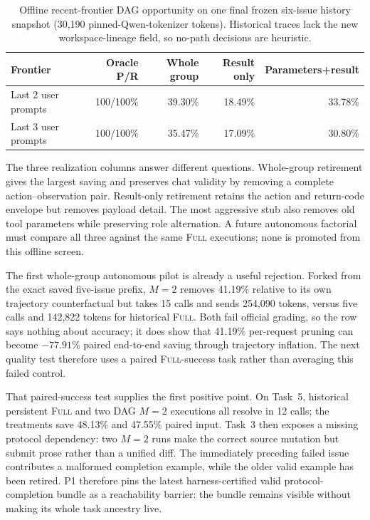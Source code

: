 \documentclass[11pt]{article}
\begin{document}
\begin{table}[H]
\centering
\footnotesize
\caption{Offline recent-frontier DAG opportunity on one final frozen six-issue
history snapshot (30,190 pinned-Qwen-tokenizer tokens).  Historical traces lack the new
workspace-lineage field, so no-path decisions are heuristic.}
\label{tab:frontier-dag-oracle}
\begin{tabular}{lrrrr}
\toprule
Frontier & Oracle P/R & Whole group & Result only & Parameters+result \\
\midrule
Last 2 user prompts & 100/100\% & 39.30\% & 18.49\% & 33.78\% \\
Last 3 user prompts & 100/100\% & 35.47\% & 17.09\% & 30.80\% \\
\bottomrule
\end{tabular}
\end{table}

The three realization columns answer different questions.  Whole-group
retirement gives the largest saving and preserves chat validity by removing a
complete action--observation pair.  Result-only retirement retains the action
and return-code envelope but removes payload detail.  The most aggressive
stub also removes old tool parameters while preserving role alternation.  A
future autonomous factorial must compare all three against the same
\textsc{Full} executions; none is promoted from this offline screen.

The first whole-group autonomous pilot is already a useful rejection.  Forked
from the exact saved five-issue prefix, $M=2$ removes 41.19\% relative to its
own trajectory counterfactual but takes 15 calls and sends 254,090 tokens,
versus five calls and 142,822 tokens for historical \textsc{Full}.  Both fail
official grading, so the row says nothing about accuracy; it does show that
41.19\% per-request pruning can become $-77.91$\% paired end-to-end saving
through trajectory inflation.  The next quality test therefore uses a paired
\textsc{Full}-success task rather than averaging this failed control.

That paired-success test supplies the first positive point.  On Task~5,
historical persistent \textsc{Full} and two DAG $M=2$ executions all resolve
in 12 calls; the treatments save 48.13\% and 47.55\% paired input.  Task~3
then exposes a missing protocol dependency: two $M=2$ runs make the correct
source mutation but submit prose rather than a unified diff.  The immediately
preceding failed issue contributes a malformed completion example, while the
older valid example has been retired.  P1 therefore pins the latest
harness-certified valid protocol-completion bundle as a reachability barrier:
the bundle remains visible without making its whole task ancestry live.
\end{document}
